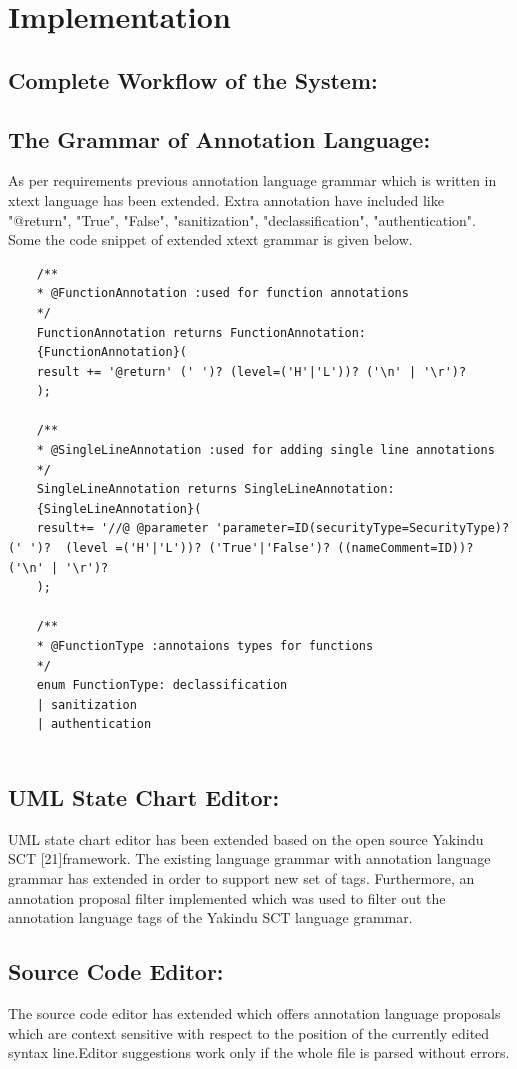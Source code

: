\chapter{Implementation}

\section{Complete Workflow of the System:}




\section{The Grammar of Annotation Language:}

As per requirements previous annotation language grammar which is written in xtext language has been extended. Extra annotation have included like "@return", "True", "False", "sanitization", "declassification", "authentication". Some the code snippet of extended xtext grammar is given below.
\begin{lstlisting}
	/**
	* @FunctionAnnotation :used for function annotations
	*/ 
	FunctionAnnotation returns FunctionAnnotation:
	{FunctionAnnotation}( 
	result += '@return' (' ')? (level=('H'|'L'))? ('\n' | '\r')?
	);
	
	/**
	* @SingleLineAnnotation :used for adding single line annotations
	*/ 
	SingleLineAnnotation returns SingleLineAnnotation:
	{SingleLineAnnotation}(
	result+= '//@ @parameter 'parameter=ID(securityType=SecurityType)? (' ')?  (level =('H'|'L'))? ('True'|'False')? ((nameComment=ID))?  ('\n' | '\r')?	 
	);
		
	/**
	* @FunctionType :annotaions types for functions
	*/ 
	enum FunctionType: declassification 
	| sanitization
	| authentication
	
\end{lstlisting}

\section{UML State Chart Editor:}
UML state chart editor has been extended based on the open source Yakindu SCT [21]framework. The existing language grammar with
annotation language grammar has extended in order to support new set
of tags. Furthermore, an annotation proposal filter implemented which was used to filter out the annotation language tags of the Yakindu SCT language grammar.

\section{Source Code Editor:}
The source code editor has extended which offers annotation language proposals which are context sensitive with respect to the position of the currently edited syntax line.Editor suggestions work only if the whole file is parsed without errors.

